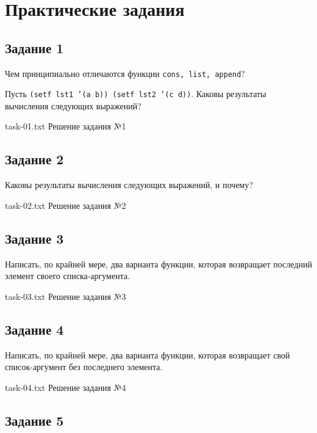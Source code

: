 \chapter{Практические задания}

\section{Задание 1}

Чем принципиально отличаются функции \texttt{cons, list, append}?

Пусть \texttt{(setf lst1 '(a b)) (setf lst2 '(c d))}.
Каковы результаты вычисления следующих выражений?

{task-01.txt} %
{Решение задания №1} %


\section{Задание 2}

Каковы результаты вычисления следующих выражений, и почему?

{task-02.txt} %
{Решение задания №2} %

\clearpage

\section{Задание 3}

Написать, по крайней мере, два варианта функции, которая возвращает последний элемент своего списка-аргумента.

{task-03.txt} %
{Решение задания №3} %

\section{Задание 4}

Написать, по крайней мере, два варианта функции, которая возвращает свой список-аргумент без последнего элемента.

{task-04.txt} %
{Решение задания №4} %

\section{Задание 5}

